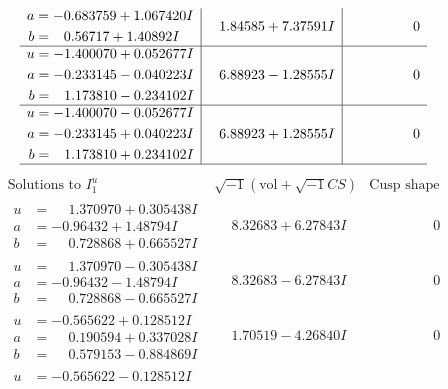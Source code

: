 \documentclass[1p]{elsarticle_modified}
\theoremstyle{definition}
\newcommand{\I}{\sqrt{-1}}
\begin{document}
$$\begin{array}{c|c|c}
\begin{aligned}
a &= -0.683759 + 1.067420 I \\
b &= \phantom{-}0.56717 + 1.40892 I\end{aligned}
 & \phantom{-}1.84585 + 7.37591 I & \phantom{-0.000000 } 0 \\ \hline\begin{aligned}
u &= -1.400070 + 0.052677 I \\
a &= -0.233145 - 0.040223 I \\
b &= \phantom{-}1.173810 - 0.234102 I\end{aligned}
 & \phantom{-}6.88923 - 1.28555 I & \phantom{-0.000000 } 0 \\ \hline\begin{aligned}
u &= -1.400070 - 0.052677 I \\
a &= -0.233145 + 0.040223 I \\
b &= \phantom{-}1.173810 + 0.234102 I\end{aligned}
 & \phantom{-}6.88923 + 1.28555 I & \phantom{-0.000000 } 0\\
 \hline 
 \end{array}$$\newpage$$\begin{array}{c|c|c}  
\text{Solutions to }I^u_{1}& \I (\text{vol} + \sqrt{-1}CS) & \text{Cusp shape}\\
 \hline 
\begin{aligned}
u &= \phantom{-}1.370970 + 0.305438 I \\
a &= -0.96432 + 1.48794 I \\
b &= \phantom{-}0.728868 + 0.665527 I\end{aligned}
 & \phantom{-}8.32683 + 6.27843 I & \phantom{-0.000000 } 0 \\ \hline\begin{aligned}
u &= \phantom{-}1.370970 - 0.305438 I \\
a &= -0.96432 - 1.48794 I \\
b &= \phantom{-}0.728868 - 0.665527 I\end{aligned}
 & \phantom{-}8.32683 - 6.27843 I & \phantom{-0.000000 } 0 \\ \hline\begin{aligned}
u &= -0.565622 + 0.128512 I \\
a &= \phantom{-}0.190594 + 0.337028 I \\
b &= \phantom{-}0.579153 - 0.884869 I\end{aligned}
 & \phantom{-}1.70519 - 4.26840 I & \phantom{-0.000000 } 0 \\ \hline\begin{aligned}
u &= -0.565622 - 0.128512 I \\

\end{aligned}
\end{array}$$
\end{document}
